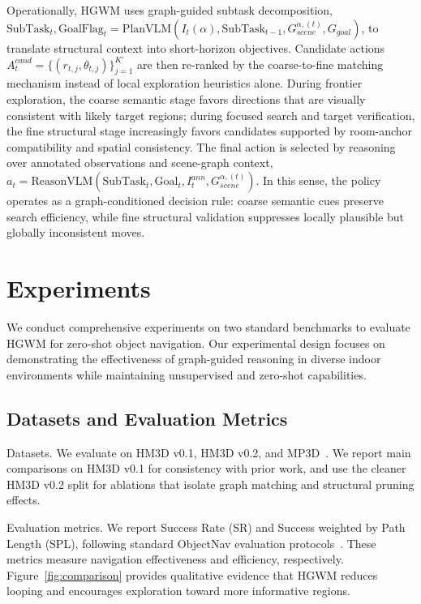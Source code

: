 \documentclass{article}
\begin{document}
Operationally, HGWM uses graph-guided subtask decomposition, $\text{SubTask}_t, \text{GoalFlag}_t = \text{PlanVLM}(I_t(\alpha), \text{SubTask}_{t-1}, G_{scene}^{\alpha,(t)}, G_{goal})$, to translate structural context into short-horizon objectives. Candidate actions $A_t^{cand} = \{(r_{t,j}, \theta_{t,j})\}_{j=1}^{K'}$ are then re-ranked by the coarse-to-fine matching mechanism instead of local exploration heuristics alone. During frontier exploration, the coarse semantic stage favors directions that are visually consistent with likely target regions; during focused search and target verification, the fine structural stage increasingly favors candidates supported by room-anchor compatibility and spatial consistency. The final action is selected by reasoning over annotated observations and scene-graph context, $a_t = \text{ReasonVLM}(\text{SubTask}_t, \text{Goal}_t, I_t^{ann}, G_{scene}^{\alpha,(t)})$. In this sense, the policy operates as a graph-conditioned decision rule: coarse semantic cues preserve search efficiency, while fine structural validation suppresses locally plausible but globally inconsistent moves.



\section{Experiments}

We conduct comprehensive experiments on two standard benchmarks to evaluate HGWM for zero-shot object navigation. Our experimental design focuses on demonstrating the effectiveness of graph-guided reasoning in diverse indoor environments while maintaining unsupervised and zero-shot capabilities.


\subsection{Datasets and Evaluation Metrics}

Datasets. We evaluate on HM3D v0.1, HM3D v0.2, and MP3D~\citep{ramakrishnan2021habitat,chang2017matterport3d}. We report main comparisons on HM3D v0.1 for consistency with prior work, and use the cleaner HM3D v0.2 split for ablations that isolate graph matching and structural pruning effects.

Evaluation metrics. We report Success Rate (SR) and Success weighted by Path Length (SPL), following standard ObjectNav evaluation protocols~\citep{anderson2018evaluation,batra2020objectnav}. These metrics measure navigation effectiveness and efficiency, respectively. Figure~\ref{fig:comparison} provides qualitative evidence that HGWM reduces looping and encourages exploration toward more informative regions.
\end{document}
